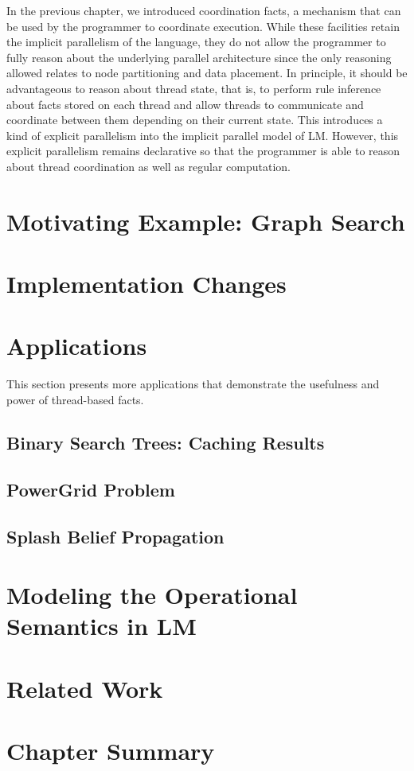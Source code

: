 In the previous chapter, we introduced coordination facts, a mechanism that can
be used by the programmer to coordinate execution. While these facilities retain
the implicit parallelism of the language, they do not allow the programmer to
fully reason about the underlying parallel architecture since the only reasoning
allowed relates to node partitioning and data placement. In principle, it should
be advantageous to reason about thread state, that is, to perform rule inference
about facts stored on each thread and allow threads to communicate and
coordinate between them depending on their current state. This introduces a kind
of explicit parallelism into the implicit parallel model of LM.  However, this
explicit parallelism remains declarative so that the programmer is able to
reason about thread coordination as well as regular computation.

\section{Motivating Example: Graph Search}


\section{Implementation Changes}


\section{Applications}

This section presents more applications that demonstrate the usefulness and
power of thread-based facts.

\subsection{Binary Search Trees: Caching Results}


\subsection{PowerGrid Problem}


\subsection{Splash Belief Propagation}\label{sec:coordination:bp}


\section{Modeling the Operational Semantics in LM}\label{sec:modelling}


\section{Related Work}


\section{Chapter Summary}

